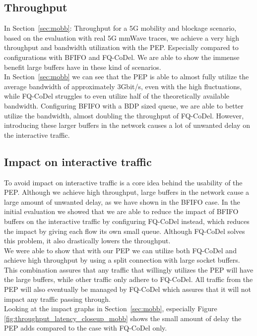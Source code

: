 \documentclass[a4paper,english, 11pt]{report}
\begin{document}
\subsection{Throughput}
In Section~\ref{sec:mobb}: Throughput for a 5G mobility and blockage scenario, based on the evaluation with real 5G mmWave traces, we achieve a very high throughput and bandwidth utilization with the PEP. Especially compared to configurations with BFIFO and FQ-CoDel. We are able to show the immense benefit large buffers have in these kind of scenarios.\\

In Section~\ref{sec:mobb} we can see that the PEP is able to almost fully utilize the average bandwidth of approximately 3Gbit/s, even with the high fluctuations, while FQ-CoDel struggles to even utilize half of the theoretically available bandwidth. Configuring BFIFO with a BDP sized queue, we are able to better utilize the bandwidth, almost doubling the throughput of FQ-CoDel. However, introducing these larger buffers in the network causes a lot of unwanted delay on the interactive traffic.

\subsection{Impact on interactive traffic}
To avoid impact on interactive traffic is a core idea behind the usability of the PEP. Although we achieve high throughput, large buffers in the network cause a large amount of unwanted delay, as we have shown in the BFIFO case. In the initial evaluation we showed that we are able to reduce the impact of BFIFO buffers on the interactive traffic by configuring FQ-CoDel instead, which reduces the impact by giving each flow its own small queue. Although FQ-CoDel solves this problem, it also drastically lowers the throughput.\\

We were able to show that with our PEP we can utilize both FQ-CoDel and achieve high throughput by using a split connection with large socket buffers. This combination assures that any traffic that willingly utilizes the PEP will have the large buffers, while other traffic only adhere to FQ-CoDel. All traffic from the PEP will also eventually be managed by FQ-CoDel which assures that it will not impact any traffic passing through.\\

Looking at the impact graphs in Section~\ref{sec:mobb}, especially Figure \ref{fig:throughput_latency_closeup_mobb} shows the small amount of delay the PEP adds compared to the case with FQ-CoDel only.
\end{document}
